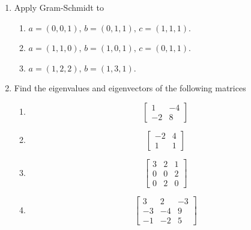 \documentclass[14pt]{amsart}
\begin{document}
\begin{enumerate}
\item  Apply Gram-Schmidt to

\begin{enumerate}

\item  $a = (0, 0, 1),\, b = (0, 1, 1),\, c = (1, 1, 1)$.

\item  $a = (1, 1, 0),\, b = (1, 0, 1),\, c = (0, 1, 1)$.

\item  $a = (1, 2, 2),\, b = (1, 3, 1)$.

\end{enumerate}

\pagebreak

\item  Find the eigenvalues and eigenvectors of the following matrices

\begin{enumerate}

\item  
%
\begin{equation*}
\begin{bmatrix}
1 & -4\\
-2 & 8
\end{bmatrix}
\end{equation*}

\item
%
\begin{equation*}
\begin{bmatrix}
-2 & 4\\
1 & 1
\end{bmatrix}
\end{equation*}

\item  
%
\begin{equation*}
\begin{bmatrix}
3 & 2 & 1\\
0 & 0 & 2\\
0 & 2 & 0
\end{bmatrix}
\end{equation*}

\item  
%
\begin{equation*}
\begin{bmatrix}
3 & 2 & -3\\
-3 & -4 & 9\\
-1 & -2 & 5
\end{bmatrix}
\end{equation*}


\end{enumerate}
\end{enumerate}
\end{document}
